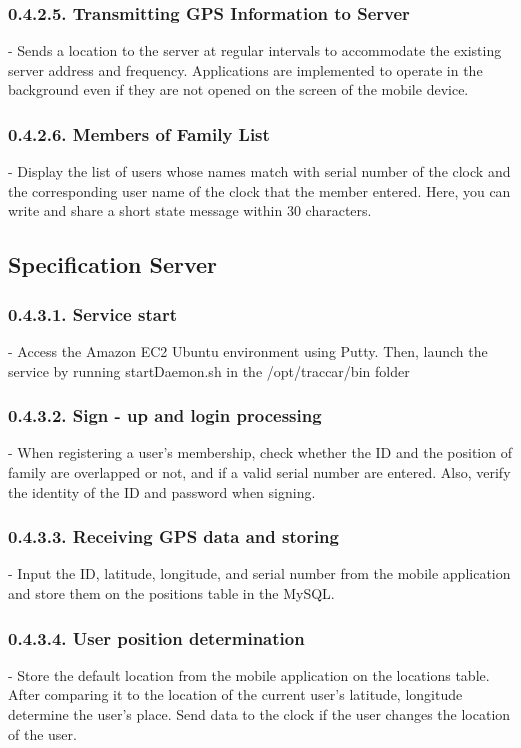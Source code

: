 \documentclass[10pt,a4paper,twocolumn]{report}
\begin{document}
 		\subsubsection{0.4.2.5. Transmitting GPS Information to Server}
 		- Sends a location to the server at regular intervals to accommodate the existing server address and frequency. Applications are implemented to operate in the background even if they are not opened on the screen of the mobile device.\\
 		\subsubsection{0.4.2.6. Members of Family List}
 		- Display the list of users whose names match with serial number of the clock and the corresponding user name of the clock that the member entered. Here, you can write and share a short state message within 30 characters. \\
 	\subsection{Specification Server}
 		\subsubsection{0.4.3.1. Service start}
 		- Access the Amazon EC2 Ubuntu environment using Putty. Then, launch the service by running startDaemon.sh in the /opt/traccar/bin folder \\
 		\subsubsection{0.4.3.2. Sign - up and login processing}
 		- When registering a user's membership, check whether the ID and the position of family are overlapped or not, and if a valid serial number are entered. Also, verify the identity of the ID and password when signing. \\
 		\subsubsection{0.4.3.3. Receiving GPS data and storing}
 		- Input the ID, latitude, longitude, and serial number from the mobile application and store them on the positions table in the MySQL. \\
 		\subsubsection{0.4.3.4. User position determination}
 		- Store the default location from the mobile application on the locations table. After comparing it to the location of the current user's latitude, longitude determine the user’s place. Send data to the clock if the user changes the location of the user.\\
\end{document}

